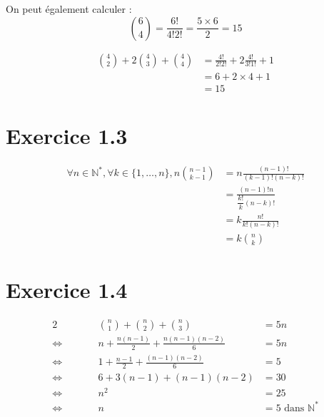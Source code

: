 \documentclass{report}
\begin{document}
On peut également calculer :
\[\binom{6}{4} = \frac{6!}{4!2!} = \frac{5 \times 6}{2} = 15\]

\begin{equation*}
	\begin{split}
		\binom{4}{2} + 2\binom{4}{3} + \binom{4}{4} &= \frac{4!}{2!2!} + 2\frac{4!}{3!1!} + 1 \\
		                                            &= 6 + 2 \times 4 + 1 \\
		                                            &= 15
	\end{split}
\end{equation*}


\section*{Exercice 1.3}

\begin{equation*}
	\begin{split}
		\forall n \in \mathbb{N}^*, \forall k \in \{1,\ldots, n\}, n\binom{n-1}{k-1} &= n \frac{(n-1)!}{(k-1)!(n-k)!} \\
		                                                                          &= \frac{(n-1)!n}{\dfrac{k!}{k}(n-k)!} \\
		                                                                          &= k \frac{n!}{k!(n-k)!} \\
		                                                                          &= k \binom{n}{k}
	\end{split}
\end{equation*}

\section*{Exercice 1.4}
\begin{alignat*}{2}
	                    &        &   \binom{n}{1} + \binom{n}{2} + \binom{n}{3} &= 5n \\
	\Longleftrightarrow & \qquad & n + \frac{n(n-1)}{2} + \frac{n(n-1)(n-2)}{6} &= 5n \\
	\Longleftrightarrow &        & 1 + \frac{n-1}{2} + \frac{(n-1)(n-2)}{6}     &= 5 \\
	\Longleftrightarrow &        &                      6 + 3(n-1) + (n-1)(n-2) &= 30 \\
    \Longleftrightarrow &        &                      n^2 &= 25 \\
    \Longleftrightarrow &        &                      n   &= 5 \text{ dans $\mathbb{N}^*$}
\end{alignat*}
\end{document}
